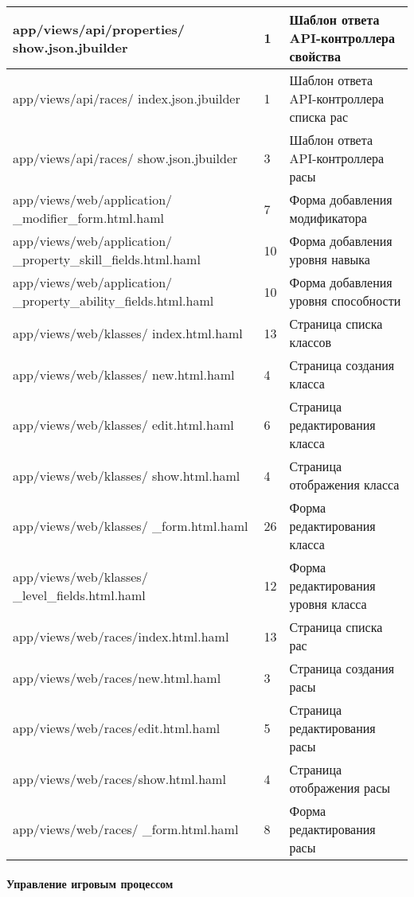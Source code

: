 \begin{longtable}[h]{| p{} | p{} | p{} |}
  \hline
  app/views/api/properties/ show.json.jbuilder  &  1  &  Шаблон ответа API-контроллера свойства \\
  \hline
  app/views/api/races/ index.json.jbuilder  &  1  &  Шаблон ответа API-контроллера списка рас \\
  \hline
  app/views/api/races/ show.json.jbuilder  &  3  &  Шаблон ответа API-контроллера расы \\
  \hline
  app/views/web/application/ \_modifier\_form.html.haml  &  7  &  Форма добавления модификатора \\
  \hline
  app/views/web/application/ \_property\_skill\_fields.html.haml  &  10  &  Форма добавления уровня навыка \\
  \hline
  app/views/web/application/ \_property\_ability\_fields.html.haml  &  10  &  Форма добавления уровня способности \\
  \hline
  app/views/web/klasses/ index.html.haml  &  13  &  Страница списка классов \\
  \hline
  app/views/web/klasses/ new.html.haml  &  4  &  Страница создания класса \\
  \hline
  app/views/web/klasses/ edit.html.haml  &  6  &  Страница редактирования класса \\
  \hline
  app/views/web/klasses/ show.html.haml  &  4  &  Страница отображения класса \\
  \hline
  app/views/web/klasses/ \_form.html.haml  &  26  &  Форма редактирования класса \\
  \hline
  app/views/web/klasses/ \_level\_fields.html.haml  &  12  &  Форма редактирования уровня класса \\
  \hline
  app/views/web/races/index.html.haml  &  13  &  Страница списка рас \\
  \hline
  app/views/web/races/new.html.haml  &  3  &  Страница создания расы \\
  \hline
  app/views/web/races/edit.html.haml  &  5  &  Страница редактирования расы \\
  \hline
  app/views/web/races/show.html.haml  &  4  &  Страница отображения расы \\
  \hline
  app/views/web/races/ \_form.html.haml  &  8  &  Форма редактирования расы \\
  \hline
\end{longtable}


\paragraph{Управление игровым процессом}

